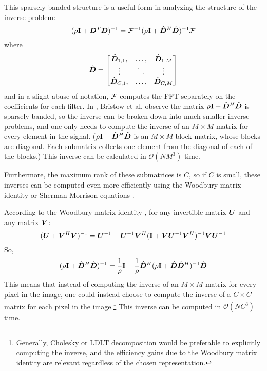 This sparsely banded structure is a useful form in analyzing the structure of the inverse problem:
\begin{equation}
(\rho {\bf I} + \bm{D}^T\bm{D})^{-1} = \mathcal{F}^{-1}(\rho{\bf I} + \hat{\bm{D}}^H\hat{\bm{D}})^{-1}\mathcal{F}
\end{equation}
%
where
\begin{equation}
\hat{\bm{D}} = \begin{bmatrix}
\hat{\bm{D}}_{1,1}, & \hdots, & \hat{\bm{D}}_{1,M}\\
\vdots & \ddots & \vdots\\
\hat{\bm{D}}_{C,1}, & \hdots, & \hat{\bm{D}}_{C,M}
\end{bmatrix}
\end{equation}
%
and in a slight abuse of notation, $\mathcal{F}$ computes the FFT separately on the coefficients for each filter.  In \cite{Bristow2013fast}, Bristow et al. observe the matrix $\rho{\bf I} + \hat{\bm{D}}^H\hat{\bm{D}}$ is sparsely banded, so the inverse can be broken down into much smaller inverse problems, and one only needs to compute the inverse of an $M \times M$ matrix for every element in the signal. ($\rho{\bf I} + \hat{\bm{D}}^H\hat{\bm{D}}$ is an $M \times M$ block matrix, whose blocks are diagonal.  Each submatrix collects one element from the diagonal of each of the blocks.) This inverse can be calculated in $\mathcal{O}(NM^3)$ time.

Furthermore, the maximum rank of these submatrices is $C$, so if $C$ is small, these inverses can be computed even more efficiently using the Woodbury matrix identity or Sherman-Morrison equations \cite{vsorel2016fast} \cite{heide2015fast} \cite{wohlberg2015efficient}.

According to the Woodbury matrix identity \cite{henderson1981deriving}, for any invertible matrix $\bm{U}$ and any matrix $\bm{V}$:
\begin{equation}
(\bm{U} + \bm{V}^H\bm{V})^{-1} = \bm{U}^{-1} - \bm{U}^{-1}\bm{V}^H({\bf I} + \bm{V}\bm{U}^{-1}\bm{V}^H)^{-1}\bm{V}\bm{U}^{-1}
\end{equation}
%
So,
\begin{equation}
(\rho{\bf I} + \hat{\bm{D}}^H\hat{\bm{D}})^{-1} = \frac{1}{\rho}{\bf I} - \frac{1}{\rho}\hat{\bm{D}}^H(\rho{\bf I} + \hat{\bm{D}}\hat{\bm{D}}^H)^{-1}\hat{\bm{D}}
\end{equation}
%
This means that instead of computing the inverse of an $M \times M$ matrix for every pixel in the image, one could instead choose to compute the inverse of a $C \times C$ matrix for each pixel in the image.\footnote{Generally, Cholesky or LDLT decomposition would be preferable to explicitly computing the inverse, and the efficiency gains due to the Woodbury matrix identity are relevant regardless of the chosen representation.} This inverse can be computed in $\mathcal{O}(NC^3)$ time.


